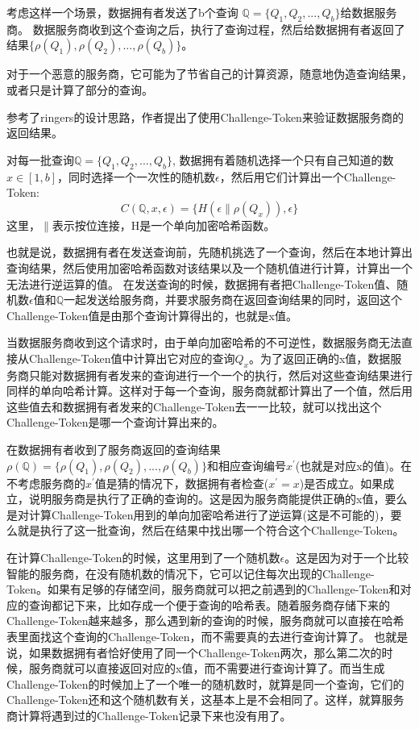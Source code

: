 考虑这样一个场景，数据拥有者发送了b个查询 $\mathbb{Q} = \{Q_1, Q_2, ... ,Q_b\}$给数据服务商。
数据服务商收到这个查询之后，执行了查询过程，然后给数据拥有者返回了结果$\{\rho(Q_1), \rho(Q_2), ..., \rho(Q_b)\}$。

对于一个恶意的服务商，它可能为了节省自己的计算资源，随意地伪造查询结果，或者只是计算了部分的查询。

参考了ringers的设计思路，作者提出了使用Challenge-Token来验证数据服务商的返回结果。

对每一批查询$\mathbb{Q} = \{Q_1, Q_2, ... ,Q_b\}$, 数据拥有着随机选择一个只有自己知道的数 $x \in [1, b]$，同时选择一个一次性的随机数$\epsilon$，然后用它们计算出一个Challenge-Token:
\begin{equation} C(\mathbb{Q}, x, \epsilon) = \{H(\epsilon \parallel \rho(Q_x)), \epsilon\}\end{equation}
这里，$\parallel$表示按位连接，H是一个单向加密哈希函数。

也就是说，数据拥有者在发送查询前，先随机挑选了一个查询，然后在本地计算出查询结果，然后使用加密哈希函数对该结果以及一个随机值进行计算，计算出一个无法进行逆运算的值。
在发送查询的时候，数据拥有者把Challenge-Token值、随机数$\epsilon$值和$\mathbb{Q}$一起发送给服务商，并要求服务商在返回查询结果的同时，返回这个Challenge-Token值是由那个查询计算得出的，也就是x值。

当数据服务商收到这个请求时，由于单向加密哈希的不可逆性，数据服务商无法直接从Challenge-Token值中计算出它对应的查询$Q_x$。为了返回正确的x值，数据服务商只能对数据拥有者发来的查询进行一个一个的执行，然后对这些查询结果进行同样的单向哈希计算。这样对于每一个查询，服务商就都计算出了一个值，然后用这些值去和数据拥有者发来的Challenge-Token去一一比较，就可以找出这个Challenge-Token是哪一个查询计算出来的。

在数据拥有者收到了服务商返回的查询结果$\rho(\mathbb{Q}) = \{\rho(Q_1), \rho(Q_2), ..., \rho(Q_b)\}$和相应查询编号$x^\prime$(也就是对应x的值)。在不考虑服务商的$x^\prime$值是猜的情况下，数据拥有者检查($x^\prime = x$)是否成立。如果成立，说明服务商是执行了正确的查询的。这是因为服务商能提供正确的x值，要么是对计算Challenge-Token用到的单向加密哈希进行了逆运算(这是不可能的)，要么就是执行了这一批查询，然后在结果中找出哪一个符合这个Challenge-Token。

在计算Challenge-Token的时候，这里用到了一个随机数$\epsilon$。这是因为对于一个比较智能的服务商，在没有随机数的情况下，它可以记住每次出现的Challenge-Token。如果有足够的存储空间，服务商就可以把之前遇到的Challenge-Token和对应的查询都记下来，比如存成一个便于查询的哈希表。随着服务商存储下来的Challenge-Token越来越多，那么遇到新的查询的时候，服务商就可以直接在哈希表里面找这个查询的Challenge-Token，而不需要真的去进行查询计算了。
也就是说，如果数据拥有者恰好使用了同一个Challenge-Token两次，那么第二次的时候，服务商就可以直接返回对应的x值，而不需要进行查询计算了。而当生成Challenge-Token的时候加上了一个唯一的随机数时，就算是同一个查询，它们的Challenge-Token还和这个随机数有关，这基本上是不会相同了。这样，就算服务商计算将遇到过的Challenge-Token记录下来也没有用了。

